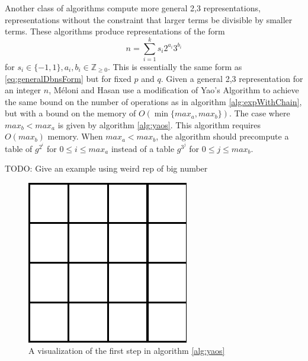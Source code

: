 \documentclass{ucalgthes1}
\theoremstyle{plain}
\theoremstyle{definition}
\newcommand{\ZZgez}{\mathbb{Z}_{\ge 0}}
\begin{document}
Another class of algorithms compute more general 2,3 representations, representations without the constraint that larger terms be divisible by smaller terms.  These algorithms produce representations of the form
\[
	n = \sum_{i=1}^k s_i 2^{a_i} 3^{b_i}
\]
for $s_i \in \{-1, 1\}, a_i, b_i \in \ZZgez$.  This is essentially the same form as \eqref{eq:generalDbnsForm} but for fixed $p$ and $q$.  Given a general 2,3 representation for an integer $n$, M\'{e}loni and Hasan use a modification of Yao's Algorithm \cite[Section 3.2]{Meloni2009} to achieve the same bound on the number of operations as in algorithm \ref{alg:expWithChain}, but with a bound on the memory of $O(\min \{max_a, max_b\})$.  The case where $max_b < max_a$ is given by algorithm \ref{alg:yaos}.  This algorithm requires $O(max_b)$ memory.  When $max_a < max_b$, the algorithm should precompute a table of $g^{2^i}$ for $0 \le i \le max_a$ instead of a table $g^{3^j}$ for $0 \le j \le max_b$.

TODO: Give an example using weird rep of big number

\begin{figure}[h]
\centering
\includegraphics{yao1}
\caption{A visualization of the first step in algorithm \ref{alg:yaos}}
\label{fig:FigureExample}
\end{figure}
\end{document}

